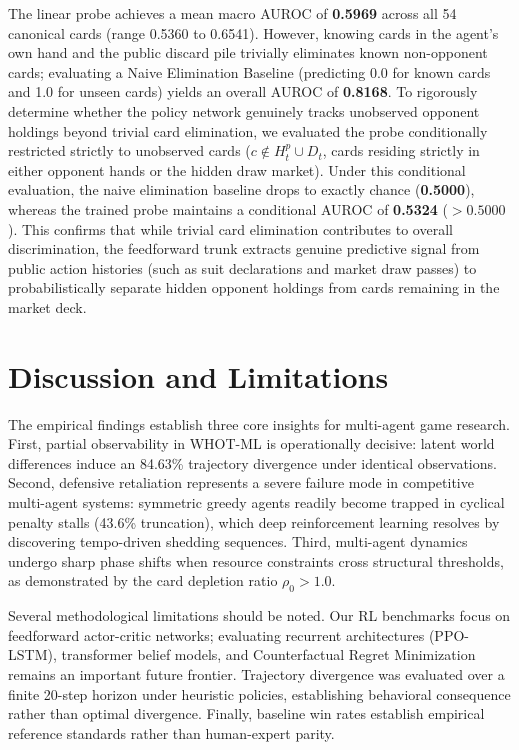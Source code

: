 \documentclass[journal]{IEEEtran}
\begin{document}
The linear probe achieves a mean macro AUROC of \textbf{0.5969} across all 54 canonical cards (range 0.5360 to 0.6541). However, knowing cards in the agent's own hand and the public discard pile trivially eliminates known non-opponent cards; evaluating a Naive Elimination Baseline (predicting 0.0 for known cards and 1.0 for unseen cards) yields an overall AUROC of \textbf{0.8168}. To rigorously determine whether the policy network genuinely tracks unobserved opponent holdings beyond trivial card elimination, we evaluated the probe conditionally restricted strictly to unobserved cards ($c \notin H_t^p \cup D_t$, cards residing strictly in either opponent hands or the hidden draw market). Under this conditional evaluation, the naive elimination baseline drops to exactly chance (\textbf{0.5000}), whereas the trained probe maintains a conditional AUROC of \textbf{0.5324} ($> 0.5000$). This confirms that while trivial card elimination contributes to overall discrimination, the feedforward trunk extracts genuine predictive signal from public action histories (such as suit declarations and market draw passes) to probabilistically separate hidden opponent holdings from cards remaining in the market deck.

\section{Discussion and Limitations}
The empirical findings establish three core insights for multi-agent game research. First, partial observability in WHOT-ML is operationally decisive: latent world differences induce an 84.63\% trajectory divergence under identical observations. Second, defensive retaliation represents a severe failure mode in competitive multi-agent systems: symmetric greedy agents readily become trapped in cyclical penalty stalls (43.6\% truncation), which deep reinforcement learning resolves by discovering tempo-driven shedding sequences. Third, multi-agent dynamics undergo sharp phase shifts when resource constraints cross structural thresholds, as demonstrated by the card depletion ratio $\rho_0 > 1.0$.

Several methodological limitations should be noted. Our RL benchmarks focus on feedforward actor-critic networks; evaluating recurrent architectures (PPO-LSTM), transformer belief models, and Counterfactual Regret Minimization remains an important future frontier. Trajectory divergence was evaluated over a finite 20-step horizon under heuristic policies, establishing behavioral consequence rather than optimal divergence. Finally, baseline win rates establish empirical reference standards rather than human-expert parity.
\end{document}
